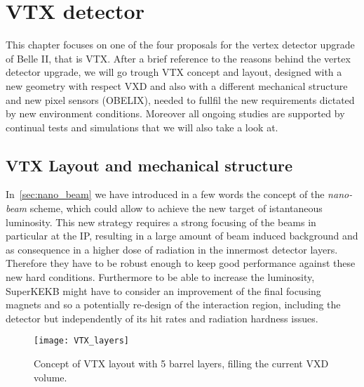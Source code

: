 \chapter{VTX detector}


This chapter focuses on one of the four proposals for the vertex detector upgrade of Belle II, that is VTX. After a brief reference to the reasons behind the vertex detector upgrade, we will go trough VTX concept and layout, designed with a new geometry with respect VXD and also with a different mechanical structure and new pixel sensors (OBELIX), needed to fullfil the new requirements dictated by new environment conditions. Moreover all ongoing studies are supported by continual tests and simulations that we will also take a look at.


\section{VTX Layout and mechanical structure}

In~\autoref{sec:nano_beam} we have introduced in a few words the concept of the \textit{nano-beam} scheme, which could allow to achieve the new target of istantaneous luminosity. This new strategy requires a strong focusing of the beams in particular at the IP, resulting in a large amount of beam induced background and as consequence in a higher dose of radiation in the innermost detector layers. Therefore they have to be robust enough to keep good performance against these new hard conditions.
Furthermore to be able to increase the luminosity, SuperKEKB might have to consider an improvement of the final focusing magnets and so a potentially re-design of the interaction region, including the detector but independently of its hit rates and radiation hardness issues.\\

\begin{figure}[h!]
\centering
\texttt{[image: VTX\_layers]}
\caption{Concept of VTX layout with 5 barrel layers, filling the current VXD volume.}
\label{fig:VTX_layers}
\end{figure}


